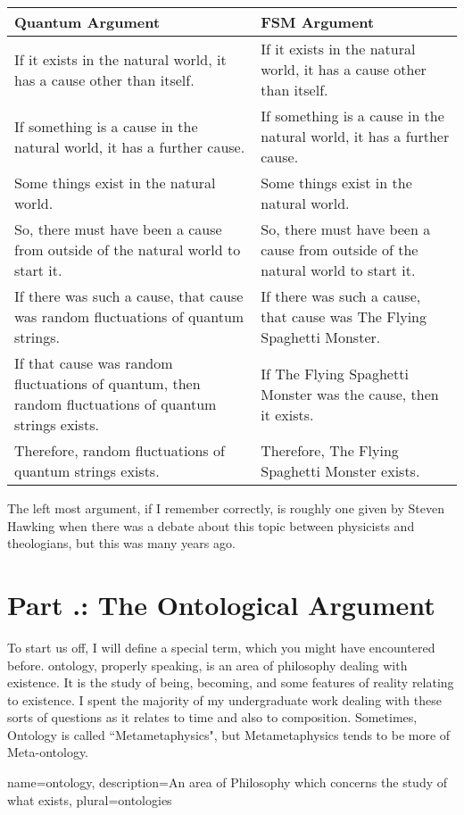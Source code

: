 \noindent
\begin{tabular}{p{2.75in}|p{2.75in}}
Quantum Argument&FSM Argument\\\hline
    If it exists in the natural world, it has a cause other than itself.&If it exists in the natural world, it has a cause other than itself.\\
    If something is a cause in the natural world, it has a further cause.&    If something is a cause in the natural world, it has a further cause.\\
    Some things exist in the natural world.&Some things exist in the natural world.\\
    So, there must have been a cause from outside of the natural world to start it.&So, there must have been a cause from outside of the natural world to start it.\\
    If there was such a cause, that cause was random fluctuations of quantum strings.&    If there was such a cause, that cause was The Flying Spaghetti Monster.\\
    If that cause was random fluctuations of quantum, then random fluctuations of quantum strings exists.& If The Flying Spaghetti Monster was the cause, then it exists.\\
    Therefore, random fluctuations of quantum strings exists.&Therefore, The Flying Spaghetti Monster exists.\\
\end{tabular}

The left most argument, if I remember correctly, is roughly one given by Steven Hawking when there was a debate about this topic between physicists and theologians, but this was many years ago.

\section{Part \thechapcount.\theseccount: The Ontological Argument}
To start us off, I will define a special term, which you might have encountered before. \Gls{ontology}, properly speaking, is an area of philosophy dealing with existence. It is the study of being, becoming, and some features of reality relating to existence.  I spent the majority of my undergraduate work dealing with these sorts of questions as it relates to time and also to composition. Sometimes, Ontology is called ``Metametaphysics", but Metametaphysics tends to be more of Meta-ontology.  

{
name=ontology,
description={An area of Philosophy which concerns the study of what exists},
plural=ontologies
}


